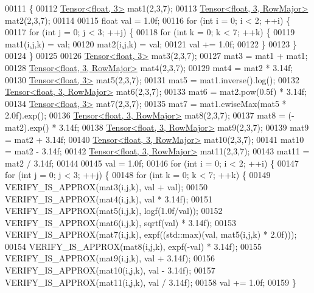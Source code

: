 \begin{DoxyCode}
00111 \{
00112   \hyperlink{class_eigen_1_1_tensor}{Tensor<float, 3>} mat1(2,3,7);
00113   \hyperlink{class_eigen_1_1_tensor}{Tensor<float, 3, RowMajor>} mat2(2,3,7);
00114 
00115   \textcolor{keywordtype}{float} val = 1.0f;
00116   \textcolor{keywordflow}{for} (\textcolor{keywordtype}{int} i = 0; i < 2; ++i) \{
00117     \textcolor{keywordflow}{for} (\textcolor{keywordtype}{int} j = 0; j < 3; ++j) \{
00118       \textcolor{keywordflow}{for} (\textcolor{keywordtype}{int} k = 0; k < 7; ++k) \{
00119         mat1(i,j,k) = val;
00120         mat2(i,j,k) = val;
00121         val += 1.0f;
00122       \}
00123     \}
00124   \}
00125 
00126   \hyperlink{class_eigen_1_1_tensor}{Tensor<float, 3>} mat3(2,3,7);
00127   mat3 = mat1 + mat1;
00128   \hyperlink{class_eigen_1_1_tensor}{Tensor<float, 3, RowMajor>} mat4(2,3,7);
00129   mat4 = mat2 * 3.14f;
00130   \hyperlink{class_eigen_1_1_tensor}{Tensor<float, 3>} mat5(2,3,7);
00131   mat5 = mat1.inverse().log();
00132   \hyperlink{class_eigen_1_1_tensor}{Tensor<float, 3, RowMajor>} mat6(2,3,7);
00133   mat6 = mat2.pow(0.5f) * 3.14f;
00134   \hyperlink{class_eigen_1_1_tensor}{Tensor<float, 3>} mat7(2,3,7);
00135   mat7 = mat1.cwiseMax(mat5 * 2.0f).exp();
00136   \hyperlink{class_eigen_1_1_tensor}{Tensor<float, 3, RowMajor>} mat8(2,3,7);
00137   mat8 = (-mat2).exp() * 3.14f;
00138   \hyperlink{class_eigen_1_1_tensor}{Tensor<float, 3, RowMajor>} mat9(2,3,7);
00139   mat9 = mat2 + 3.14f;
00140   \hyperlink{class_eigen_1_1_tensor}{Tensor<float, 3, RowMajor>} mat10(2,3,7);
00141   mat10 = mat2 - 3.14f;
00142   \hyperlink{class_eigen_1_1_tensor}{Tensor<float, 3, RowMajor>} mat11(2,3,7);
00143   mat11 = mat2 / 3.14f;
00144 
00145   val = 1.0f;
00146   \textcolor{keywordflow}{for} (\textcolor{keywordtype}{int} i = 0; i < 2; ++i) \{
00147     \textcolor{keywordflow}{for} (\textcolor{keywordtype}{int} j = 0; j < 3; ++j) \{
00148       \textcolor{keywordflow}{for} (\textcolor{keywordtype}{int} k = 0; k < 7; ++k) \{
00149         VERIFY\_IS\_APPROX(mat3(i,j,k), val + val);
00150         VERIFY\_IS\_APPROX(mat4(i,j,k), val * 3.14f);
00151         VERIFY\_IS\_APPROX(mat5(i,j,k), logf(1.0f/val));
00152         VERIFY\_IS\_APPROX(mat6(i,j,k), sqrtf(val) * 3.14f);
00153         VERIFY\_IS\_APPROX(mat7(i,j,k), expf((std::max)(val, mat5(i,j,k) * 2.0f)));
00154         VERIFY\_IS\_APPROX(mat8(i,j,k), expf(-val) * 3.14f);
00155         VERIFY\_IS\_APPROX(mat9(i,j,k), val + 3.14f);
00156         VERIFY\_IS\_APPROX(mat10(i,j,k), val - 3.14f);
00157         VERIFY\_IS\_APPROX(mat11(i,j,k), val / 3.14f);
00158         val += 1.0f;
00159       \}

\end{DoxyCode}
